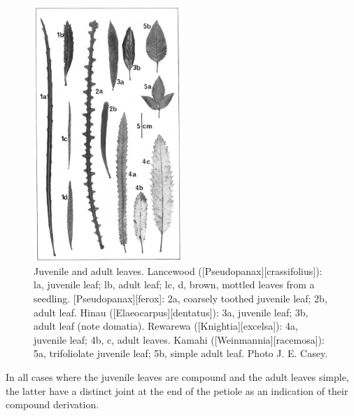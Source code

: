 \begin{figure}
	\includegraphics[width=0.5\textwidth]{graphics/figure19leaves.jpg}
	\centering
	\caption[Juvenile and adult leaves]{Juvenile and adult leaves.
Lancewood ([Pseudopanax][crassifolius]): la, juvenile leaf; lb, adult leaf; lc, d, brown, mottled leaves from a seedling. [Pseudopanax][ferox]: 2a, coarsely toothed juvenile leaf; 2b, adult leaf.
Hinau ([Elaeocarpus][dentatus]): 3a, juvenile leaf; 3b, adult leaf (note domatia).
Rewarewa ([Knightia][excelsa]): 4a, juvenile leaf; 4b, c, adult leaves.
Kamahi ([Weinmannia][racemosa]): 5a, trifoliolate juvenile leaf; 5b, simple adult leaf.
Photo  J. E. Casey.}%
	\label{fig:19leaves}
\end{figure}

In all cases where the juvenile leaves are compound and the adult leaves simple, the latter have a distinct joint at the end of the petiole as an indication of their compound derivation.

